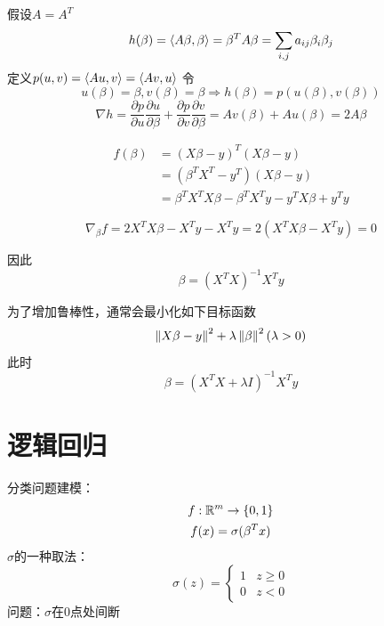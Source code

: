 \documentclass[11pt]{article}
\begin{document}
假设\(A=A^T\)
\begin{equation*}
h(\beta)=\langle A\beta,\beta\rangle=\beta^TA\beta=\sum_{i,j}a_{ij}\beta_i\beta_j
\end{equation*}
定义\(p(u,v)=\langle Au,v\rangle=\langle Av,u\rangle\)
令
\begin{equation*}
u(\beta)=\beta,v(\beta)=\beta\Rightarrow h(\beta)=p(u(\beta),v(\beta))
\end{equation*}
\begin{equation*}
\nabla h=\frac{\partial p}{\partial u}\frac{\partial u}{\partial\beta}+\frac{\partial p}{\partial v}\frac{\partial v}{\partial \beta}=Av(\beta)+Au(\beta)=2A\beta
\end{equation*}

\begin{align*}
f(\beta)&=(X\beta-y)^T(X\beta-y)\\
&=(\beta^TX^T-y^T)(X\beta-y)\\
&=\beta^TX^TX\beta-\beta^TX^Ty-y^TX\beta+y^Ty
\end{align*}

\begin{equation*}
\nabla_\beta f=2X^TX\beta-X^Ty-X^Ty=2(X^TX\beta-X^Ty)=0
\end{equation*}

因此
\begin{equation*}
\beta=(X^TX)^{-1}X^Ty
\end{equation*}

为了增加鲁棒性，通常会最小化如下目标函数
\begin{equation*}
\left\lVert X\beta-y\right\rVert^2+\lambda\left\lVert\beta\right\rVert^2(\lambda>0)
\end{equation*}
此时
\begin{equation*}
\beta=(X^TX+\lambda I)^{-1}X^Ty
\end{equation*}

\section{逻辑回归}
\label{sec:orge75657d}
分类问题建模：
\begin{gather*}
f:\mathbb{R}^m\to\{0,1\}\\
f(x)=\sigma(\beta^Tx)
\end{gather*}
\(\sigma\)的一种取法：
\begin{equation*}
\sigma(z)=
\begin{cases}
1&z\ge 0\\
0&z<0
\end{cases}
\end{equation*}
问题：\(\sigma\)在0点处间断
\end{document}
